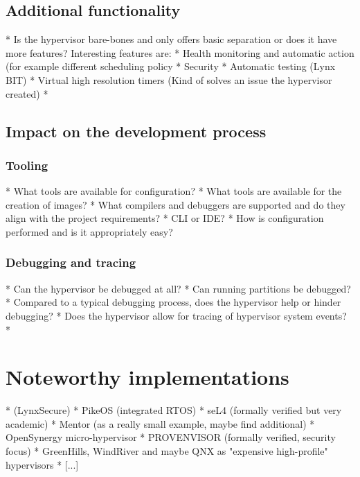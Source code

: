 \subsection{Additional functionality}
* Is the hypervisor bare-bones and only offers basic separation or does it have more features?
Interesting features are:
	* Health monitoring and automatic action (for example different scheduling policy
    * Security 
    * Automatic testing (Lynx BIT)
    * Virtual high resolution timers (Kind of solves an issue the hypervisor created)
    * 
\subsection{Impact on the development process}
\subsubsection{Tooling}
* What tools are available for configuration?
* What tools are available for the creation of images?
* What compilers and debuggers are supported and do they align with the project requirements?
* CLI or IDE?
* How is configuration performed and is it appropriately easy?
\subsubsection{Debugging and tracing}
* Can the hypervisor be debugged at all?
* Can running partitions be debugged?
* Compared to a typical debugging process, does the hypervisor help or hinder debugging?
* Does the hypervisor allow for tracing of hypervisor system events?
* 


\section{Noteworthy implementations}
* (LynxSecure)
* PikeOS (integrated RTOS)
* seL4 (formally verified but very academic)
* Mentor (as a really small example, maybe find additional)
* OpenSynergy micro-hypervisor
* PROVENVISOR (formally verified, security focus)
* GreenHills, WindRiver and maybe QNX as "expensive high-profile" hypervisors
* [...]